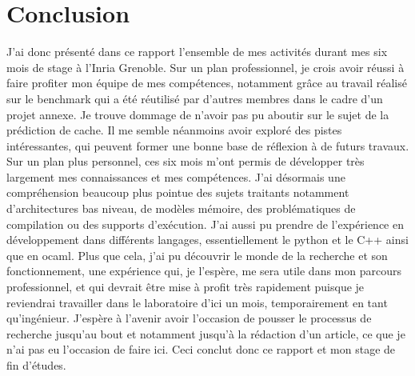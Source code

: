 \documentclass{report}
\begin{document}
\chapter{Conclusion}
J'ai donc présenté dans ce rapport l'ensemble de mes activités durant mes six mois de stage à l'Inria
Grenoble. Sur un plan professionnel, je crois avoir réussi à faire profiter mon équipe de mes compétences,
notamment grâce au travail réalisé sur le benchmark qui a été réutilisé par d'autres membres dans le cadre
d'un projet annexe. Je trouve dommage de n'avoir pas pu aboutir sur le sujet de la prédiction de cache. 
Il me semble néanmoins avoir exploré des pistes intéressantes, qui peuvent former une bonne
base de réflexion à de futurs travaux.
\\Sur un plan plus personnel, ces six mois m'ont permis de développer très largement mes connaissances et
mes compétences. J'ai désormais une compréhension beaucoup plus pointue des sujets traitants notamment
d'architectures bas niveau, de modèles mémoire, des problématiques de compilation ou des supports 
d'exécution. J'ai aussi pu prendre de l'expérience en développement dans différents langages,
essentiellement le python et le C++ ainsi que en ocaml. Plus que cela, j'ai pu découvrir le monde de la
recherche et son fonctionnement, une expérience qui, je l'espère, me sera utile dans mon parcours 
professionnel, et qui devrait être mise à profit très rapidement puisque je reviendrai travailler dans
le laboratoire d'ici un mois, temporairement en tant qu'ingénieur. J'espère à l'avenir avoir l'occasion
de pousser le processus de recherche jusqu'au bout et notamment jusqu'à la rédaction d'un article, ce
que je n'ai pas eu l'occasion de faire ici. Ceci conclut donc ce rapport et mon stage de fin d'études.
 

\end{document}
